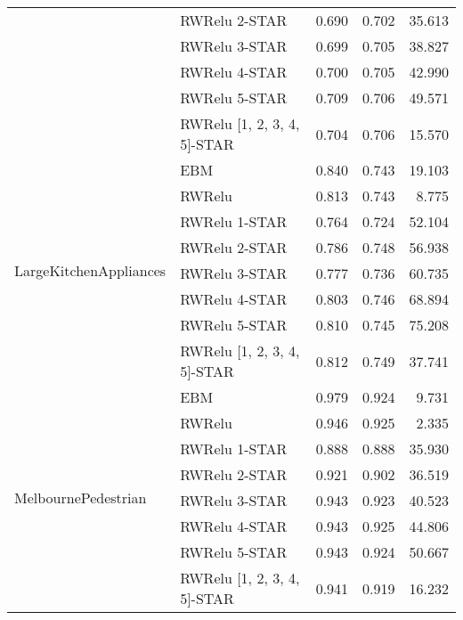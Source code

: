 \begin{tabular}{llrrr}
 & RWRelu 2-STAR & 0.690 & 0.702 & 35.613 \\
 & RWRelu 3-STAR & 0.699 & 0.705 & 38.827 \\
 & RWRelu 4-STAR & 0.700 & 0.705 & 42.990 \\
 & RWRelu 5-STAR & 0.709 & 0.706 & 49.571 \\
 & RWRelu [1, 2, 3, 4, 5]-STAR & 0.704 & 0.706 & 15.570 \\
\cline{1-5}
\multirow[t]{8}{*}{LargeKitchenAppliances} & EBM & 0.840 & 0.743 & 19.103 \\
 & RWRelu & 0.813 & 0.743 & 8.775 \\
 & RWRelu 1-STAR & 0.764 & 0.724 & 52.104 \\
 & RWRelu 2-STAR & 0.786 & 0.748 & 56.938 \\
 & RWRelu 3-STAR & 0.777 & 0.736 & 60.735 \\
 & RWRelu 4-STAR & 0.803 & 0.746 & 68.894 \\
 & RWRelu 5-STAR & 0.810 & 0.745 & 75.208 \\
 & RWRelu [1, 2, 3, 4, 5]-STAR & 0.812 & 0.749 & 37.741 \\
\cline{1-5}
\multirow[t]{8}{*}{MelbournePedestrian} & EBM & 0.979 & 0.924 & 9.731 \\
 & RWRelu & 0.946 & 0.925 & 2.335 \\
 & RWRelu 1-STAR & 0.888 & 0.888 & 35.930 \\
 & RWRelu 2-STAR & 0.921 & 0.902 & 36.519 \\
 & RWRelu 3-STAR & 0.943 & 0.923 & 40.523 \\
 & RWRelu 4-STAR & 0.943 & 0.925 & 44.806 \\
 & RWRelu 5-STAR & 0.943 & 0.924 & 50.667 \\
 & RWRelu [1, 2, 3, 4, 5]-STAR & 0.941 & 0.919 & 16.232 \\
\cline{1-5}
\bottomrule
\end{tabular}
